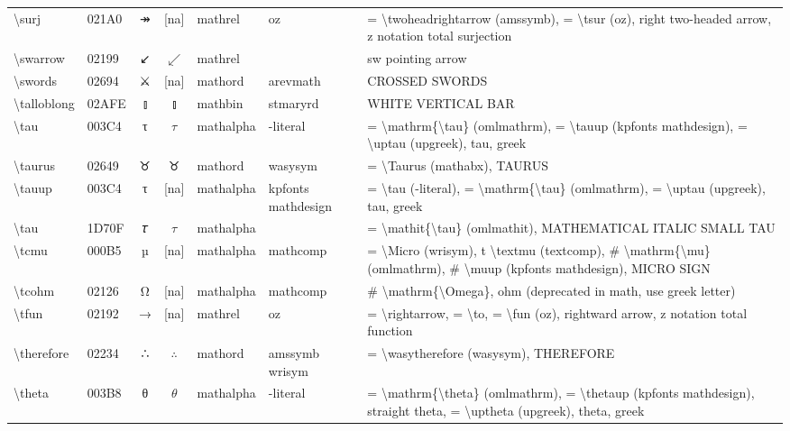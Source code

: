 \documentclass[a4paper,landscape]{article}
\begin{document}
\begin{longtable}{llcclll}
\textbackslash{}surj & 021A0 & ↠ & [na] & mathrel & oz & = \textbackslash{}twoheadrightarrow (amssymb), = \textbackslash{}tsur (oz),  right two-headed arrow,  z notation total surjection \\
\textbackslash{}swarrow & 02199 & ↙ & $\swarrow$ & mathrel &  & sw pointing arrow \\
\textbackslash{}swords & 02694 & ⚔ & [na] & mathord & arevmath & CROSSED SWORDS \\
\textbackslash{}talloblong & 02AFE & ⫾ & $\talloblong$ & mathbin & stmaryrd & WHITE VERTICAL BAR \\
\textbackslash{}tau & 003C4 & τ & $\tau$ & mathalpha & -literal & = \textbackslash{}mathrm\{\textbackslash{}tau\} (omlmathrm), = \textbackslash{}tauup (kpfonts mathdesign), = \textbackslash{}uptau (upgreek), tau, greek \\
\textbackslash{}taurus & 02649 & \textsf ♉ & $\taurus$ & mathord & wasysym & = \textbackslash{}Taurus (mathabx), TAURUS \\
\textbackslash{}tauup & 003C4 & τ & [na] & mathalpha & kpfonts mathdesign & = \textbackslash{}tau (-literal), = \textbackslash{}mathrm\{\textbackslash{}tau\} (omlmathrm),  = \textbackslash{}uptau (upgreek),  tau,  greek \\
\textbackslash{}tau & 1D70F & 𝜏 & $\tau$ & mathalpha &  & = \textbackslash{}mathit\{\textbackslash{}tau\} (omlmathit), MATHEMATICAL ITALIC SMALL TAU \\
\textbackslash{}tcmu & 000B5 & µ & [na] & mathalpha & mathcomp & = \textbackslash{}Micro (wrisym),  t \textbackslash{}textmu (textcomp),  \# \textbackslash{}mathrm\{\textbackslash{}mu\} (omlmathrm),  \# \textbackslash{}muup (kpfonts mathdesign),  MICRO SIGN \\
\textbackslash{}tcohm & 02126 & Ω & [na] & mathalpha & mathcomp & \# \textbackslash{}mathrm\{\textbackslash{}Omega\}, ohm (deprecated in math, use greek letter) \\
\textbackslash{}tfun & 02192 & → & [na] & mathrel & oz & = \textbackslash{}rightarrow, = \textbackslash{}to,  = \textbackslash{}fun (oz),  rightward arrow,  z notation total function \\
\textbackslash{}therefore & 02234 & ∴ & $\therefore$ & mathord & amssymb wrisym & = \textbackslash{}wasytherefore (wasysym), THEREFORE \\
\textbackslash{}theta & 003B8 & θ & $\theta$ & mathalpha & -literal & = \textbackslash{}mathrm\{\textbackslash{}theta\} (omlmathrm), = \textbackslash{}thetaup (kpfonts mathdesign), straight theta, = \textbackslash{}uptheta (upgreek), theta, greek \\

\end{longtable}
\end{document}
